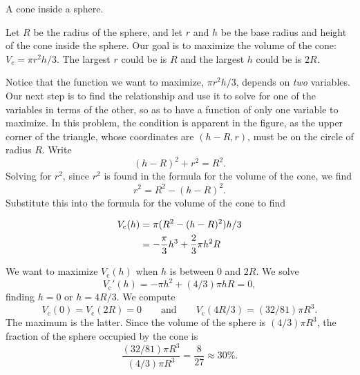 \begin{marginfigure}
\caption{A cone inside a sphere.}
\label{fig:cone-sphere}
\end{marginfigure}

\begin{solution}
Let $R$ be the radius of the sphere, and let $r$ and $h$ be the base
radius and height of the cone inside the sphere.  Our goal is to
maximize the volume of the cone: $V_c=\pi r^2h/3$.  The largest $r$
could be is $R$ and the largest $h$ could be is $2R$.

Notice that the function we want to maximize, $\pi r^2h/3$, depends on
\textit{two} variables.  Our next step is to find the relationship and
use it to solve for one of the variables in terms of the other, so as
to have a function of only one variable to maximize.  In this problem,
the condition is apparent in the figure, as the upper corner of the
triangle, whose coordinates are $(h-R,r)$, must be on the circle of
radius $R$. Write
\[
(h-R)^2+r^2=R^2.
\] 
Solving for $r^2$, since $r^2$ is found in the formula for the volume
of the cone, we find 
\[
r^2=R^2-(h-R)^2.
\]  
Substitute this into the formula for the volume of the cone to find

\begin{align*}
 V_{\text{c}}(h)&=\pi(R^2-(h-R)^2)h/3 \\
&=-{\pi\over3}h^3+{2\over3}\pi h^2R
\end{align*}

We want to maximize $V_{\text{c}}(h)$ when $h$ is between 0 and $2R$.  We
solve 
\[
V_{\text{c}}'(h)=-\pi h^2+(4/3)\pi h R=0,
\] 
finding $h=0$ or $h=4R/3$.  We compute
\[
V_{\text{c}}(0)=V_{\text{c}}(2R)=0\qquad\text{and}\qquad V_{\text{c}}(4R/3)=(32/81)\pi R^3.
\] 
The maximum is the latter. Since the volume of the sphere is $(4/3)\pi
R^3$, the fraction of the sphere occupied by the cone is
\[
\frac{(32/81)\pi R^3}{(4/3)\pi R^3}=\frac{8}{27}\approx 30\%.
\]
\end{solution}






